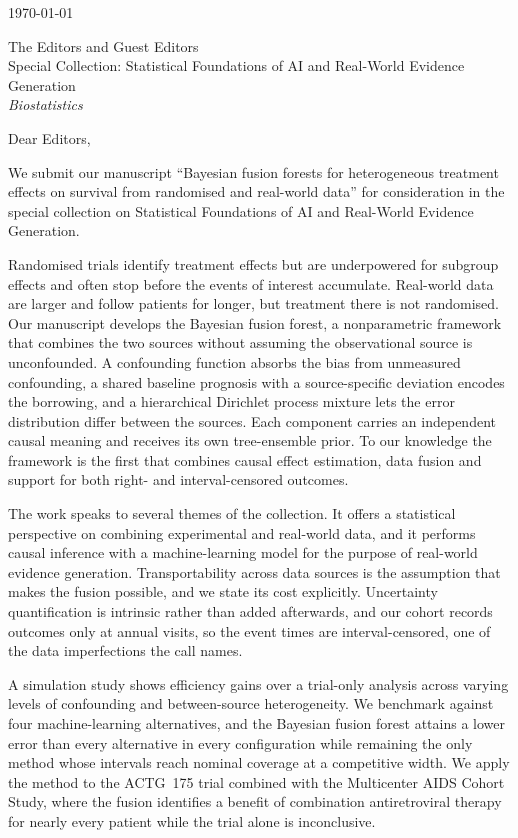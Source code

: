 \documentclass[11pt]{article}
\begin{document}
\hfill \today

\medskip

The Editors and Guest Editors \\
Special Collection: Statistical Foundations of AI and Real-World Evidence
Generation \\
\textit{Biostatistics}

\medskip

Dear Editors,

We submit our manuscript ``Bayesian fusion forests for heterogeneous treatment
effects on survival from randomised and real-world data'' for consideration in
the special collection on Statistical Foundations of AI and Real-World Evidence
Generation.

Randomised trials identify treatment effects but are underpowered for subgroup
effects and often stop before the events of interest accumulate. Real-world
data are larger and follow patients for longer, but treatment there is not
randomised. Our manuscript develops the Bayesian fusion forest, a nonparametric
framework that combines the two sources without assuming the observational
source is unconfounded. A confounding function absorbs the bias from unmeasured
confounding, a shared baseline prognosis with a source-specific deviation
encodes the borrowing, and a hierarchical Dirichlet process mixture lets the
error distribution differ between the sources. Each component carries an
independent causal meaning and receives its own tree-ensemble prior. To our
knowledge the framework is the first that combines causal effect estimation,
data fusion and support for both right- and interval-censored outcomes.

The work speaks to several themes of the collection. It offers a statistical
perspective on combining experimental and real-world data, and it performs
causal inference with a machine-learning model for the purpose of real-world
evidence generation. Transportability across data sources is the assumption
that makes the fusion possible, and we state its cost explicitly. Uncertainty
quantification is intrinsic rather than added afterwards, and our cohort
records outcomes only at annual visits, so the event times are
interval-censored, one of the data imperfections the call names.

A simulation study shows efficiency gains over a trial-only analysis across
varying levels of confounding and between-source heterogeneity. We benchmark
against four machine-learning alternatives, and the Bayesian fusion forest
attains a
lower error than every alternative in every configuration while remaining the
only method whose intervals reach nominal coverage at a competitive width. We
apply the method to the ACTG~175 trial combined with the Multicenter AIDS
Cohort Study, where the fusion identifies a benefit of combination
antiretroviral therapy for nearly every patient while the trial alone is
inconclusive.
\end{document}
